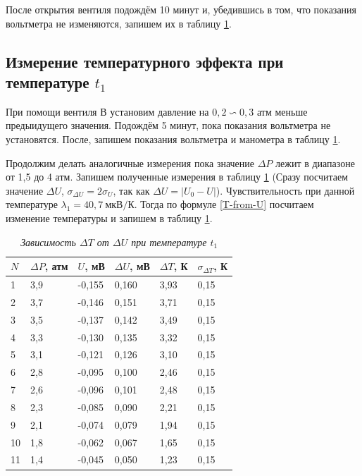 \documentclass[a4paper,12pt]{article}
\begin{document}
После открытия вентиля подождём 10 минут и, убедившись в том, что показания вольтметра не изменяются, запишем их в таблицу \ref{P-T-1}.

\subsection{Измерение температурного эффекта при температуре $t_1$}

При помощи вентиля В установим давление на $0,2 \backsim 0,3$ атм меньше предыидущего значения. Подождём 5 минут, пока показания вольтметра не установятся. После, запишем показания вольтметра и манометра в таблицу \ref{P-T-1}. 

Продолжим делать аналогичные измерения пока значение $\Delta P$ лежит в диапазоне от 1,5 до 4 атм. Запишем полученные измерения в таблицу \ref{P-T-1} (Сразу посчитаем значение $\Delta U$, $\sigma_{\Delta U} = 2\sigma_U$, так как $\Delta U = |U_0 - U|$). Чувствительность при данной температуре $\lambda_1 = 40,7 \ \text{мкВ}/\text{К}$. Тогда по формуле \eqref{T-from-U} посчитаем изменение температуры и запишем в таблицу \ref{P-T-1}.

\begin{table}[!h]
    \centering
    \begin{tabular}{|l|l|l|l|l|l|}
    \hline
        $N$ & $\Delta P$, атм & $U$, мВ & $\Delta U$, мВ & $\Delta T$, К & $\sigma_{\Delta T}$, К \\ \hline
        1 & 3,9 & -0,155 & 0,160 & 3,93 & 0,15 \\ \hline
        2 & 3,7 & -0,146 & 0,151 & 3,71 & 0,15 \\ \hline
        3 & 3,5 & -0,137 & 0,142 & 3,49 & 0,15 \\ \hline
        4 & 3,3 & -0,130 & 0,135 & 3,32 & 0,15 \\ \hline
        5 & 3,1 & -0,121 & 0,126 & 3,10 & 0,15 \\ \hline
        6 & 2,8 & -0,095 & 0,100 & 2,46 & 0,15 \\ \hline
        7 & 2,6 & -0,096 & 0,101 & 2,48 & 0,15 \\ \hline
        8 & 2,3 & -0,085 & 0,090 & 2,21 & 0,15 \\ \hline
        9 & 2,1 & -0,074 & 0,079 & 1,94 & 0,15 \\ \hline
        10 & 1,8 & -0,062 & 0,067 & 1,65 & 0,15 \\ \hline
        11 & 1,4 & -0,045 & 0,050 & 1,23 & 0,15 \\ \hline
    \end{tabular}\caption{\textit{Зависимость $\Delta T$ от $\Delta U$ при температуре $t_1$}}\label{P-T-1}
\end{table}
\end{document}
